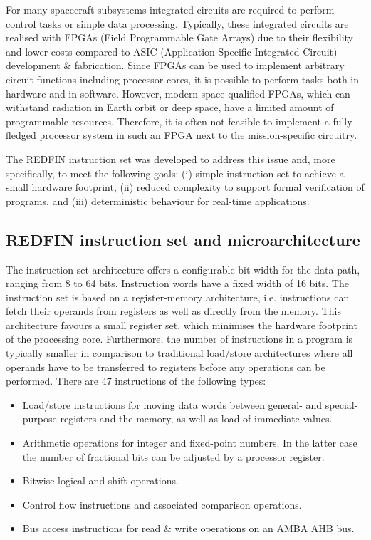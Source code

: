 
For many spacecraft subsystems integrated circuits are required to perform control
tasks or simple data processing. Typically, these integrated circuits are realised
with FPGAs (Field Programmable Gate Arrays) due to their flexibility and lower
costs compared to ASIC (Application-Specific Integrated Circuit) development \&
fabrication. Since FPGAs can be used to implement arbitrary circuit functions
including processor cores, it is possible to perform tasks both in hardware and
in software. However, modern space-qualified FPGAs, which can withstand radiation
in Earth orbit or deep space, have a limited amount of programmable resources.
Therefore, it is often not feasible to implement a fully-fledged processor system
in such an FPGA next to the mission-specific circuitry.

The REDFIN instruction set was developed to address this issue and, more
specifically, to meet the following goals: (i) simple instruction set to
achieve a small hardware footprint, (ii) reduced complexity to support formal
verification of programs, and (iii) deterministic behaviour for real-time
applications.


\subsection{REDFIN instruction set and microarchitecture}


The instruction set architecture offers a configurable bit width for the
data path, ranging from 8 to 64 bits. Instruction words have a fixed width of 16
bits. The instruction set is based on a register-memory architecture, i.e.
instructions can fetch their operands from registers as well as directly from the
memory. This architecture favours a small register set, which minimises the hardware
footprint of the processing core. Furthermore, the number of instructions in a
program is typically smaller in comparison to traditional load/store architectures
where all operands have to be transferred to registers before any operations can
be performed. There are 47 instructions of the following types:


\begin{itemize}
\item{Load/store instructions for moving data words between general- and
special-purpose registers and the memory, as well as load of immediate values.}
\item{Arithmetic operations for integer and fixed-point numbers. In the latter
case the number of fractional bits can be adjusted by a processor register.}
\item{Bitwise logical and shift operations.}
\item{Control flow instructions and associated comparison operations.}
\item{Bus access instructions for read \& write operations on an AMBA AHB bus.}
\end{itemize}


